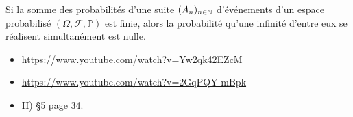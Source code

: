 \begin{lemme}
    Si la somme des probabilités d'une suite $(A_n)_{n \in \mathbb{N}}$ d'événements d'un espace probabilisé $(\Omega, \mathscr{F}, \mathbb{P})$ est finie, alors la probabilité qu'une infinité d'entre eux se réalisent simultanément est nulle.
\end{lemme}

\begin{itemize}
    \item \url{https://www.youtube.com/watch?v=Yw2qk42EZcM}
    \item \url{https://www.youtube.com/watch?v=2GqPQY-mBpk}
    \item \cite{intro_graph_alea} II) §5 page 34.
\end{itemize}